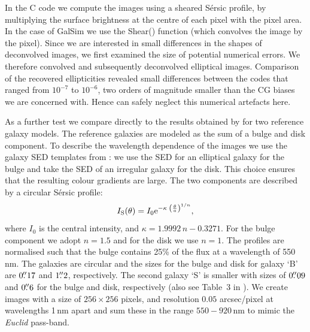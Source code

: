 \documentclass[useAMS,usenatbib]{mnras}
\newcommand{\be}{\begin{equation}}
\newcommand{\ee}{\end{equation}}
\begin{document}
In the C code we compute the images using a sheared S{\'e}rsic profile, 
by multiplying the surface brightness at the centre of each pixel with the pixel area. In the case of {\sc GalSim} we use the {\sc Shear()} function (which convolves the image by the pixel). Since we are interested in small differences in the shapes of
deconvolved images, we first examined the size of potential numerical errors. We therefore convolved and
subsequently deconvolved elliptical images. Comparison of the recovered ellipticities revealed small differences between the codes that ranged from $10^{-7}$ to $10^{-6}$, two orders of magnitude
smaller than the CG biases we are concerned with. Hence can safely neglect this numerical artefacts here.

As a further test we compare directly to the results obtained by  for two reference galaxy models.  The reference galaxies are modeled as the sum of a bulge and disk component. To describe the wavelength dependence of the images we use the galaxy SED templates from \citet{1980ApJS...43..393C}: we use the SED for an elliptical galaxy for the bulge and take the SED of an irregular galaxy for the disk. This choice ensures that the resulting colour gradients are large. The two components are  described by a circular S{\'e}rsic profile:
\be
I_{\rm S}(\theta) = I_0 {\rm e}^{-\kappa\; \left(\frac{\theta}{a}\right)^{1/n}},
\ee
%
where $I_0$ is the central intensity, and $\kappa=1.9992\,n -0.3271$. For the bulge component we adopt $n=1.5$ and for the disk we use $n=1$. The profiles are normalised such that the bulge contains 25\% of the flux at a wavelength of 550\,nm. The galaxies are circular and the sizes for the bulge and disk for galaxy `B'   are $0\hbox{$.\!\!^{\prime\prime}$}17$ and $1\hbox{$.\!\!^{\prime\prime}$}2$, respectively. The second galaxy `S' is smaller with sizes of $0\hbox{$.\!\!^{\prime\prime}$}09$ and $0\hbox{$.\!\!^{\prime\prime}$}6$  for the bulge and disk, respectively (also see Table~3 in ). We create images with a size of  $256\times256$ pixels, and resolution $0.05$ arcsec/pixel at wavelengths 1\,nm apart and sum these in the range $550-920$\,nm to mimic the {\it Euclid} pass-band.
\end{document}
